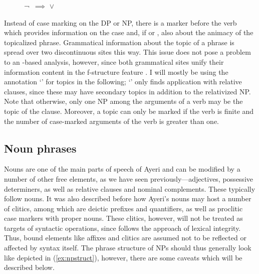 \begin{figure}[h]
\ex\label{ex:topicrule}
¬\,\downs{\Case} $\implies$ \pass{\Top} $\vee$ \elem{\Top}
\xe
\end{figure}

Instead of case marking on the DP or NP, there is a marker before the verb
which provides information on the case and, if \AgtT{} or \PatT{}, also about
the animacy of the topicalized phrase. Grammatical information about the topic
of a phrase is spread over two discontinuous sites this way. This issue does
not pose a problem to an \Lfg{}-based analysis, however, since both grammatical
sites unify their information content in the f-structure feature \Top{}. I will
mostly be using the annotation `\pass{\Top}' for topics in the following;
`\elem{\Top}' only finds application with relative clauses, since these may
have secondary topics in addition to the relativized NP. Note that otherwise,
only one NP among the arguments of a verb may be the topic of the clause.
Moreover, a topic can only be marked if the verb is finite and the number of
case-marked arguments of the verb is greater than one.


\subsection{Noun phrases}
\label{subsec:nps}


Nouns are one of the main parts of speech of Ayeri and can be modified by a
number of other free elements, as we have seen previously---adjectives,
possessive determiners, as well as relative clauses and nominal complements. These
typically follow nouns. It was also described before how Ayeri's nouns may
host a number of clitics, among which are deictic prefixes and quantifiers, as
well as proclitic case markers with proper nouns. These clitics, however, will
not be treated as targets of syntactic operations, since \Lfg{} follows the
approach of lexical integrity. Thus, bound elements like affixes and clitics
are assumed not to be reflected or affected by syntax itself. The phrase
structure of NPs should thus generally look like depicted in
(\ref{ex:npstruct}), however, there are some caveats which will be described
below.

